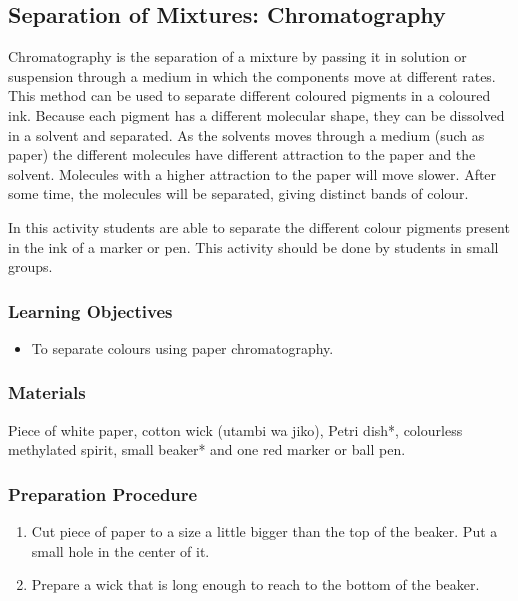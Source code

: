 \subsection{Separation of Mixtures: Chromatography}
Chromatography is the separation of a mixture by passing it in solution or suspension through a medium in which the components move at different rates. This method can be used to separate different coloured pigments in a coloured ink. Because each pigment has a different molecular shape, they can be dissolved in a solvent and separated. As the solvents moves through a medium (such as paper) the different molecules have different attraction to the paper and the solvent. Molecules with a higher attraction to the paper will move slower. After some time, the molecules will be separated, giving distinct bands of colour.

In this activity students are able to separate the different colour pigments present in the ink of a marker or pen. This activity should be done by students in small groups.
\subsubsection*{Learning Objectives}
\begin{itemize}

\item{To separate colours using paper chromatography.}

\end{itemize}

\subsubsection*{Materials}
Piece of white paper, cotton wick (utambi wa jiko), Petri dish*, colourless methylated spirit, small beaker* and one red marker or ball pen.

\subsubsection*{Preparation Procedure}
\begin{enumerate}
\item{Cut piece of paper to a size a little bigger than the top of the beaker. Put a small hole in the center of it.}
\item{Prepare a wick that is long enough to reach to the bottom of the beaker.}
\end{enumerate}


